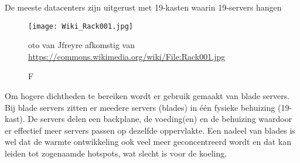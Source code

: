 De meeste datacenters zijn uitgerust met 19\inch-kasten waarin 19\inch-servers hangen

\begin{figure}[h!]
\texttt{[image: Wiki\_Rack001.jpg]}
\caption Foto van Jfreyre afkomstig van \url{https://commons.wikimedia.org/wiki/File:Rack001.jpg}
\centering
\end{figure}

Om hogere dichtheden te bereiken wordt er gebruik gemaakt van blade servers. Bij blade servers zitten er meedere servers (blades) in \'e\'en fysieke behuizing (19\inch-kast). De servers delen een backplane, de voeding(en) en de behuizing waardoor er effectief meer servers passen op dezelfde oppervlakte. Een nadeel van blades is wel dat de warmte ontwikkeling ook veel meer geconcentreerd wordt en dat kan leiden tot zogenaamde hotspots, wat slecht is voor de koeling.
